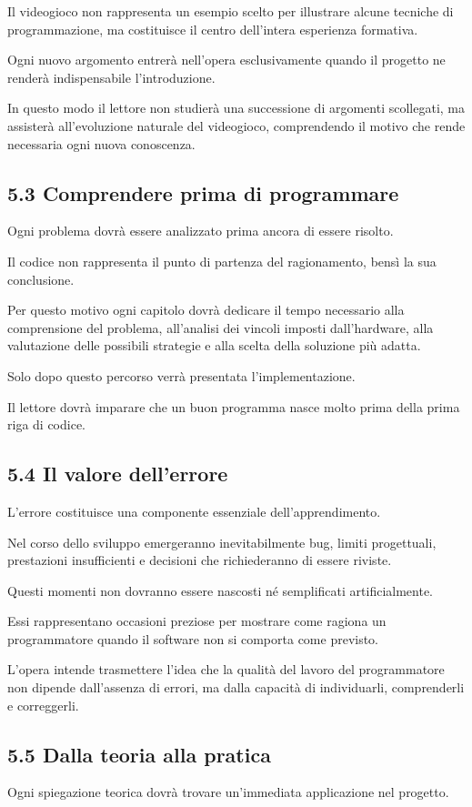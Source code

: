 \documentclass{article}
\begin{document}
Il videogioco non rappresenta un esempio scelto per illustrare alcune tecniche di programmazione, ma costituisce il
centro dell'intera esperienza formativa.

Ogni nuovo argomento entrerà nell'opera esclusivamente quando il progetto ne renderà indispensabile l'introduzione.

In questo modo il lettore non studierà una successione di argomenti scollegati, ma assisterà all'evoluzione naturale del
videogioco, comprendendo il motivo che rende necessaria ogni nuova conoscenza.

\subsection{5.3 Comprendere prima di programmare}
Ogni problema dovrà essere analizzato prima ancora di essere risolto.

Il codice non rappresenta il punto di partenza del ragionamento, bensì la sua conclusione.

Per questo motivo ogni capitolo dovrà dedicare il tempo necessario alla comprensione del problema, all'analisi dei
vincoli imposti dall'hardware, alla valutazione delle possibili strategie e alla scelta della soluzione più adatta.

Solo dopo questo percorso verrà presentata l'implementazione.

Il lettore dovrà imparare che un buon programma nasce molto prima della prima riga di codice.

\subsection[5.4 Il valore dell{}'errore]{5.4 Il valore dell'errore}
L'errore costituisce una componente essenziale dell'apprendimento.

Nel corso dello sviluppo emergeranno inevitabilmente bug, limiti progettuali, prestazioni insufficienti e decisioni che
richiederanno di essere riviste.

Questi momenti non dovranno essere nascosti né semplificati artificialmente.

Essi rappresentano occasioni preziose per mostrare come ragiona un programmatore quando il software non si comporta come
previsto.

L'opera intende trasmettere l'idea che la qualità del lavoro del programmatore non dipende dall'assenza di errori, ma
dalla capacità di individuarli, comprenderli e correggerli.

\subsection{5.5 Dalla teoria alla pratica}
Ogni spiegazione teorica dovrà trovare un'immediata applicazione nel progetto.
\end{document}
